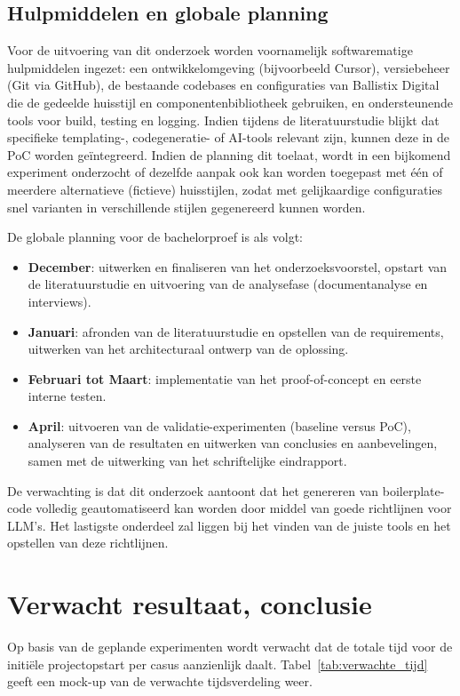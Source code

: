 \subsection*{Hulpmiddelen en globale planning}
Voor de uitvoering van dit onderzoek worden voornamelijk softwarematige hulpmiddelen ingezet: een ontwikkelomgeving (bijvoorbeeld Cursor), versiebeheer (Git via GitHub), de bestaande codebases en configuraties van Ballistix Digital die de gedeelde huisstijl en componentenbibliotheek gebruiken, en ondersteunende tools voor build, testing en logging. Indien tijdens de literatuurstudie blijkt dat specifieke templating-, codegeneratie- of AI-tools relevant zijn, kunnen deze in de PoC worden geïntegreerd. Indien de planning dit toelaat, wordt in een bijkomend experiment onderzocht of dezelfde aanpak ook kan worden toegepast met één of meerdere alternatieve (fictieve) huisstijlen, zodat met gelijkaardige configuraties snel varianten in verschillende stijlen gegenereerd kunnen worden.

De globale planning voor de bachelorproef is als volgt:
\begin{itemize}
  \item \textbf{December}: uitwerken en finaliseren van het onderzoeksvoorstel, opstart van de literatuurstudie en uitvoering van de analysefase (documentanalyse en interviews).
  \item \textbf{Januari}: afronden van de literatuurstudie en opstellen van de requirements, uitwerken van het architecturaal ontwerp van de oplossing.
  \item \textbf{Februari tot Maart}: implementatie van het proof-of-concept en eerste interne testen.
  \item \textbf{April}: uitvoeren van de validatie-experimenten (baseline versus PoC), analyseren van de resultaten en uitwerken van conclusies en aanbevelingen, samen met de uitwerking van het schriftelijke eindrapport.
\end{itemize}

De verwachting is dat dit onderzoek aantoont dat het genereren van boilerplate-code volledig geautomatiseerd kan worden door middel van goede richtlijnen voor LLM's. Het lastigste onderdeel zal liggen bij het vinden van de juiste tools en het opstellen van deze richtlijnen.

\section{Verwacht resultaat, conclusie}
Op basis van de geplande experimenten wordt verwacht dat de totale tijd voor de initiële projectopstart per casus aanzienlijk daalt. Tabel~\ref{tab:verwachte_tijd} geeft een mock-up van de verwachte tijdsverdeling weer.


